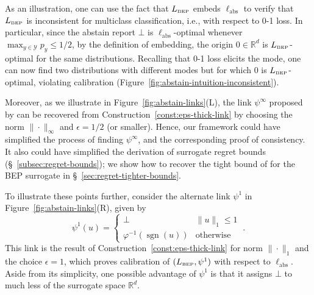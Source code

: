 \documentclass[twoside,11pt]{article}
\newcommand{\reals}{\mathbb{R}}
\newcommand{\prop}[1]{\mathrm{prop}[#1]}
\newcommand{\BEP}{L_{\text{\tiny BEP}}}
\newcommand{\ellabstain}{\ell_{\text{abs}}}
\newcommand{\mode}{\mathrm{mode}}
\newcommand{\Y}{\mathcal{Y}}
\DeclareMathOperator*{\sgn}{sgn}
\begin{document}
As an illustration, one can use the fact that $\BEP$ embeds $\ellabstain$ to verify that $\BEP$ is inconsistent for multiclass classification, i.e., with respect to 0-1 loss.
In particular, since the abstain report $\bot$ is $\ellabstain$-optimal whenever $\max_{y\in\Y} p_y \leq 1/2$, by the definition of embedding, the origin $0\in\reals^d$ is $\BEP$-optimal for the same distributions.
Recalling that 0-1 loss elicits the mode, one can now find two distributions with different modes but for which $0$ is $\BEP$-optimal, violating calibration (Figure~\ref{fig:abstain-intuition-inconsistent}).

Moreover, as we illustrate in Figure~\ref{fig:abstain-links}(L), the link $\psi^{\infty}$ proposed by \citeauthor{ramaswamy2018consistent} can be recovered from Construction~\ref{const:eps-thick-link} by choosing the norm $\|\cdot\|_\infty$ and $\epsilon=1/2$ (or smaller).
Hence, our framework could have simplified the process of finding $\psi^\infty$, and the corresponding proof of consistency.
It also could have simplified the derivation of surrogate regret bounds (\S~\ref{subsec:regret-bounds}); we show how to recover the tight bound of \citeauthor{ramaswamy2018consistent} for the BEP surrogate in \S~\ref{sec:regret-tighter-bounds}.

To illustrate these points further, consider the alternate link $\psi^1$
in Figure~\ref{fig:abstain-links}(R),
given by
\begin{equation}\label{eq:abstain-link-1}
  \psi^1(u) = \begin{cases}
	\bot & \|u\|_1 \leq 1\\
	\varphi^{-1}(\sgn(u)) &\text{otherwise}
  \end{cases}~.
\end{equation}
This link is the result of Construction~\ref{const:eps-thick-link} for norm $\|\cdot\|_1$ and the choice $\epsilon=1$, which proves calibration of $(\BEP,\psi^1)$ with respect to $\ellabstain$.
Aside from its simplicity, one possible advantage of $\psi^1$ is that it assigns $\bot$ to much less of the surrogate space $\reals^d$.
\end{document}
